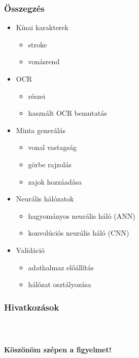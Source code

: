 \documentclass{beamer}
\begin{document}
\begin{frame}[fragile]
\frametitle{Összegzés}
\begin{itemize}
\item Kínai karakterek
	\begin{itemize}
	\item stroke
	\item vonásrend
	\end{itemize}
\item OCR
	\begin{itemize}
	\item részei
	\item használt OCR bemutatás
	\end{itemize}
\item Minta generálás
	\begin{itemize}
	\item vonal vastagság
	\item görbe rajzolás
	\item zajok hozzáadása
	\end{itemize}
\item Neurális hálózatok
	\begin{itemize}
	\item hagyományos neurális háló (ANN)
	\item konvolúciós neurális háló (CNN)
	\end{itemize}
\item Valídáció
	\begin{itemize}
	\item adathalmaz előállítás
	\item hálózat osztályozása
	\end{itemize}
\end{itemize}

\end{frame}


\begin{frame}[fragile]
\frametitle{Hivatkozások}
\begin{thebibliography}{9}




\end{thebibliography}

\end{frame}

\begin{frame}[fragile]
    \frametitle{\ }

\begin{center}
\Large \textbf{Köszönöm szépen a figyelmet!}
\end{center}

\end{frame}
\end{document}
